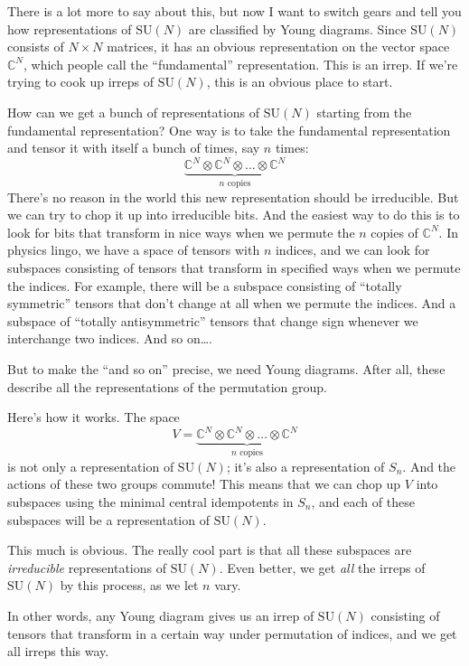 \documentclass{article}
\begin{document}
There is a lot more to say about this, but now I want to switch gears
and tell you how representations of \(\mathrm{SU}(N)\) are classified by
Young diagrams. Since \(\mathrm{SU}(N)\) consists of \(N\times N\)
matrices, it has an obvious representation on the vector space
\(\mathbb{C}^N\), which people call the ``fundamental'' representation.
This is an irrep. If we're trying to cook up irreps of
\(\mathrm{SU}(N)\), this is an obvious place to start.

How can we get a bunch of representations of \(\mathrm{SU}(N)\) starting
from the fundamental representation? One way is to take the fundamental
representation and tensor it with itself a bunch of times, say \(n\)
times:
\[\underbrace{\mathbb{C}^N\otimes\mathbb{C}^N\otimes\ldots\otimes\mathbb{C}^N}_{\mbox{$n$ copies}}\]
There's no reason in the world this new representation should be
irreducible. But we can try to chop it up into irreducible bits. And the
easiest way to do this is to look for bits that transform in nice ways
when we permute the \(n\) copies of \(\mathbb{C}^N\). In physics lingo,
we have a space of tensors with \(n\) indices, and we can look for
subspaces consisting of tensors that transform in specified ways when we
permute the indices. For example, there will be a subspace consisting of
``totally symmetric'' tensors that don't change at all when we permute
the indices. And a subspace of ``totally antisymmetric'' tensors that
change sign whenever we interchange two indices. And so on\ldots.

But to make the ``and so on'' precise, we need Young diagrams. After
all, these describe all the representations of the permutation group.

Here's how it works. The space
\[V = \underbrace{\mathbb{C}^N\otimes\mathbb{C}^N\otimes\ldots\otimes\mathbb{C}^N}_{\mbox{$n$ copies}}\]
is not only a representation of \(\mathrm{SU}(N)\); it's also a
representation of \(S_n\). And the actions of these two groups commute!
This means that we can chop up \(V\) into subspaces using the minimal
central idempotents in \(S_n\), and each of these subspaces will be a
representation of \(\mathrm{SU}(N)\).

This much is obvious. The really cool part is that all these subspaces
are \emph{irreducible} representations of \(\mathrm{SU}(N)\). Even
better, we get \emph{all} the irreps of \(\mathrm{SU}(N)\) by this
process, as we let \(n\) vary.

In other words, any Young diagram gives us an irrep of
\(\mathrm{SU}(N)\) consisting of tensors that transform in a certain way
under permutation of indices, and we get all irreps this way.
\end{document}
